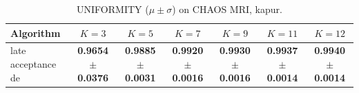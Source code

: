 \begin{table}[htbp]
\centering
\caption{UNIFORMITY ($\mu \pm \sigma$) on CHAOS MRI, kapur.}
\label{tab:exp2-kapur-uniformity}
\begin{tabular}{lcccccc}
\toprule
Algorithm & $K=3$ & $K=5$ & $K=7$ & $K=9$ & $K=11$ & $K=12$ \\
\midrule
late acceptance de & \textbf{0.9654 $\pm$ 0.0376} & \textbf{0.9885 $\pm$ 0.0031} & \textbf{0.9920 $\pm$ 0.0016} & \textbf{0.9930 $\pm$ 0.0016} & \textbf{0.9937 $\pm$ 0.0014} & \textbf{0.9940 $\pm$ 0.0014} \\
\bottomrule
\end{tabular}
\end{table}